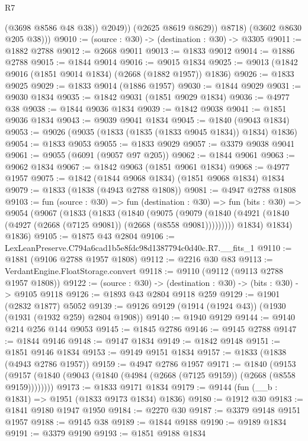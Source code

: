 \begin{lexlean}{R7}
\begin{coremodule}
                  (@3698 @8586 @48 @38))
                @2049))
            (@2625 @8619 @8629))
          @8718)
        (@3602 @8630 @205 @38)))
@9010 := (source : @30) -> (destination : @30) -> @3305
@9011 := @1882 @2788
@9012 := @2668 @9011
@9013 := @1833 @9012
@9014 := @1886 @2788
@9015 := @1844 @9014
@9016 := @9015 @1834
@9025 := @9013 (@1842 @9016 (@1851 @9014 @1834) (@2668 (@1882 @1957)) @1836)
@9026 := @1833 @9025
@9029 := @1833 @9014 (@1886 @1957)
@9030 := @1844 @9029
@9031 := @9030 @1834
@9035 := @1842 @9031 (@1851 @9029 @1834)
@9036 := @4977 @38
@9038 := @1844 @9036 @1834
@9039 := @1842 @9038
@9041 := @1851 @9036 @1834
@9043 := @9039 @9041 @1834
@9045 := @1840 (@9043 @1834)
@9053 := @9026 (@9035 (@1833 (@1835 (@1833 @9045 @1834)) @1834) @1836)
@9054 := @1833 @9053
@9055 := @1833 @9029
@9057 := @3379 @9038 @9041
@9061 := @9055 (@6091 (@9057 @97 @205))
@9062 := @1844 @9061
@9063 := @9062 @1834
@9067 := @1842 @9063 (@1851 @9061 @1834)
@9068 := @4977 @1957
@9075 := @1842 (@1844 @9068 @1834) (@1851 @9068 @1834) @1834
@9079 := @1833 (@1838 (@4943 @2788 @1808))
@9081 := @4947 @2788 @1808
@9103 := fun (source : @30) =>
  fun (destination : @30) =>
  fun (bits : @30) =>
  @9054
    (@9067
      (@1833
        (@1833
          (@1840
            (@9075
              (@9079 (@1840 (@4921 (@1840 (@4927 (@2668 (@7125 @9081)) (@2668 (@8558 @9081)))))))))
          @1834)
        @1834)
      @1836)
@9105 := @1875 @43 @2804
@9106 := LexLeanPreserve.C794a6cad1b5e8fdc98d1387794c0d40c.R7.__fits_1
@9110 := @1881 (@9106 @2788 @1957 @1808)
@9112 := @2216 @30 @83
@9113 := VerdantEngine.FloatStorage.convert
@9118 := @9110 (@9112 (@9113 @2788 @1957 @1808))
@9122 := (source : @30) -> (destination : @30) -> (bits : @30) -> @9105 @9118
@9126 := @1893 @43 @2804 @9118 @259
@9129 := @1901 (@2832 @1877) @5052
@9139 := @9126 @9129 (@1914 (@1924 @43)) (@1930 (@1931 (@1932 @259) @2804 @1908))
@9140 := @1940 @9129
@9144 := @9140 @214 @256 @144 @9053
@9145 := @1845 @2786
@9146 := @9145 @2788
@9147 := @1844 @9146
@9148 := @9147 @1834
@9149 := @1842 @9148
@9151 := @1851 @9146 @1834
@9153 := @9149 @9151 @1834
@9157 := @1833 (@1838 (@4943 @2786 @1957))
@9159 := @4947 @2786 @1957
@9171 := @1840
    (@9153 (@9157 (@1840 (@9043 (@1840 (@4984 (@2668 (@7125 @9159)) (@2668 (@8558 @9159))))))))
@9173 := @1833 @9171 @1834
@9179 := @9144 (fun (__b : @1831) => @1951 (@1833 @9173 @1834) @1836)
@9180 := @1912 @30
@9183 := @1841 @9180 @1947 @1950
@9184 := @2270 @30
@9187 := @3379 @9148 @9151 @1957
@9188 := @9145 @38
@9189 := @1844 @9188
@9190 := @9189 @1834
@9191 := @3379 @9190
@9193 := @1851 @9188 @1834

\end{coremodule}
\end{lexlean}
